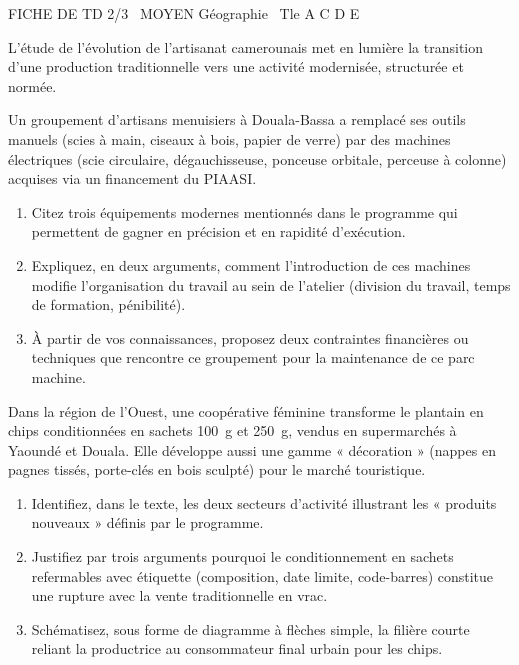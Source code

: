 \documentclass[11pt]{article}
\begin{document}
\begin{tcolorbox}[enhanced,colback=popink,colframe=popink,arc=10pt,boxrule=0pt,left=12pt,right=12pt,top=9pt,bottom=9pt]
{\color{white}\popxbold\small FICHE DE TD 2/3 \textbullet\ MOYEN \hfill Géographie \textbullet\ Tle A C D E\par}
\end{tcolorbox}
\vspace{4pt}
L'étude de l'évolution de l'artisanat camerounais met en lumière la transition d'une production traditionnelle vers une activité modernisée, structurée et normée.

\begin{exercice}
Un groupement d'artisans menuisiers à Douala-Bassa a remplacé ses outils manuels (scies à main, ciseaux à bois, papier de verre) par des machines électriques (scie circulaire, dégauchisseuse, ponceuse orbitale, perceuse à colonne) acquises via un financement du PIAASI.
\begin{enumerate}
    \item Citez trois équipements modernes mentionnés dans le programme qui permettent de gagner en précision et en rapidité d'exécution.
    \item Expliquez, en deux arguments, comment l'introduction de ces machines modifie l'organisation du travail au sein de l'atelier (division du travail, temps de formation, pénibilité).
    \item À partir de vos connaissances, proposez deux contraintes financières ou techniques que rencontre ce groupement pour la maintenance de ce parc machine.
\end{enumerate}
\end{exercice}

\begin{exercice}
Dans la région de l'Ouest, une coopérative féminine transforme le plantain en chips conditionnées en sachets \SI{100}{\gram} et \SI{250}{\gram}, vendus en supermarchés à Yaoundé et Douala. Elle développe aussi une gamme « décoration » (nappes en pagnes tissés, porte-clés en bois sculpté) pour le marché touristique.
\begin{enumerate}
    \item Identifiez, dans le texte, les deux secteurs d'activité illustrant les « produits nouveaux » définis par le programme.
    \item Justifiez par trois arguments pourquoi le conditionnement en sachets refermables avec étiquette (composition, date limite, code-barres) constitue une rupture avec la vente traditionnelle en vrac.
    \item Schématisez, sous forme de diagramme à flèches simple, la filière courte reliant la productrice au consommateur final urbain pour les chips.
\end{enumerate}
\end{exercice}
\end{document}
